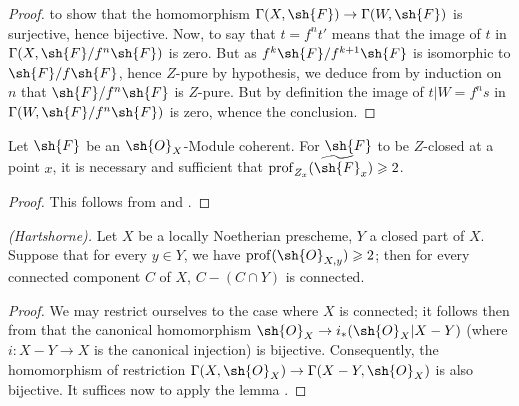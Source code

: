 \begin{proof}

to show that the homomorphism $\Gamma(X,\sh{F})\to\Gamma(W,\sh{F})$ is surjective, hence bijective.
Now, to say that $t=f^nt'$ means that the image of $t$ in $\Gamma(X,\sh{F}/f^n\sh{F})$ is zero.
But as $f^k\sh{F}/f^{k+1}\sh{F}$ is isomorphic to $\sh{F}/f\sh{F}$, hence $Z$-pure by hypothesis, we deduce from  by induction on $n$ that $\sh{F}/f^n\sh{F}$ is $Z$-pure.
But by definition the image of $t|W=f^ns$ in $\Gamma(W,\sh{F}/f^n\sh{F})$ is zero, whence the conclusion.
\end{proof}

\begin{corollary}[5.10.6]
\label{IV.5.10.6}
Let $\sh{F}$ be an $\sh{O}_X$-Module coherent.
For $\sh{F}$ to be $Z$-closed at a point $x$, it is necessary and sufficient that $\operatorname{prof}_{Z_x}(\widetilde{\sh{F}}_x)\geqslant 2$.
\end{corollary}

\begin{proof}
This follows from  and .
\end{proof}

\begin{theorem}[5.10.7]
\label{IV.5.10.7}
\emph{(Hartshorne).}
Let $X$ be a locally Noetherian prescheme, $Y$ a closed part of $X$.
Suppose that for every $y\in Y$, we have $\operatorname{prof}(\sh{O}_{X,y})\geqslant 2$; then for every connected component $C$ of $X$, $C-(C\cap Y)$ is connected.
\end{theorem}

\begin{proof}
We may restrict ourselves to the case where $X$ is connected; it follows then from  that the canonical homomorphism $\sh{O}_X\to i_*(\sh{O}_X|X-Y)$ (where $i:X-Y\to X$ is the canonical injection) is bijective.
Consequently, the homomorphism of restriction $\Gamma(X,\sh{O}_X)\to\Gamma(X-Y,\sh{O}_X)$ is also bijective.
It suffices now to apply the lemma .
\end{proof}

